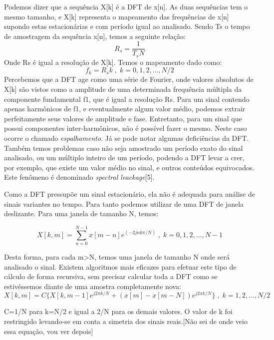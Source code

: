 \documentclass[a4paper, 12pt]{book}
\begin{document}
Podemos dizer que a sequência X[k] é a DFT de x[n]. As duas sequências tem o mesmo tamanho, e X[k] representa o mapeamento das frequências de x[n] supondo estas estacionárias e com período igual ao analisado. Sendo Ts o tempo de amostragem da sequência x[n], temos a seguinte relação:
\begin{equation}
R_s=\frac{1}{T_sN}
\end{equation}
\indent Onde Rs é igual a resolução de X[k]. Temos o mapeamento dado como:
\begin{equation}
f_k=R_s k\;,\;k=0, 1, 2,...,N/2
\end{equation}
\indent Percebemos que a DFT age como uma série de Fourier, onde valores absolutos de X[k] são vistos como a amplitude de uma determinada frequência múltipla da componente fundamental f1, que é igual a resolução Rs. Para um sinal contendo apenas harmônicos de f1, e eventualmente algum valor médio, podemos extrair perfeitamente seus valores de amplitude e fase. Entretanto, para um sinal que possui componentes inter-harmônicos, não é possível fazer o mesmo. Neste caso ocorre o chamado \textit{espalhamento}. Já se pode notar algumas deficiências da DFT. Também temos problemas caso não seja amostrado um período exato do sinal analisado, ou um múltiplo inteiro de um período, podendo a DFT levar a crer, por exemplo, que existe um valor médio no sinal, e outros conteúdos equivocados. Este fenômeno é denominado \textit{spectral leackage}[5]. 

\indent Como a DFT pressupõe um sinal estacionário, ela não é adequada para análise de sinais variantes no tempo. Para tanto podemos utilizar de uma DFT de janela deslizante. Para uma janela de tamanho N, temos:

\begin{equation}
X[k,m]=\sum_{n=0}^{N-1} x[m-n]e^{(-2jnk\pi/N)}\;,\;k=0,1,2,...,N-1
\end{equation}

\indent Desta forma, para cada m>N, temos uma janela de tamanho N onde será analisado o sinal. Existem algoritmos mais eficazes para efetuar este tipo de cálculo de forma recursiva, sem precisar calcular toda a DFT como se estivéssemos diante de uma amostra completamente nova:
\begin{equation}
X[k,m]=C\{X[k,m-1]e^{j2\pi k/N}+(x[m]-x[m-N])e^{j2\pi k/N}\}\;,\;k=1,2,...,N/2
\end{equation}

\indent C=1/N para k=N/2 e igual a 2/N para os demais valores. O valor de k foi restringido levando-se em conta a simetria dos sinais reais.[Não sei de onde veio essa equação, vou ver depois]
\end{document}
